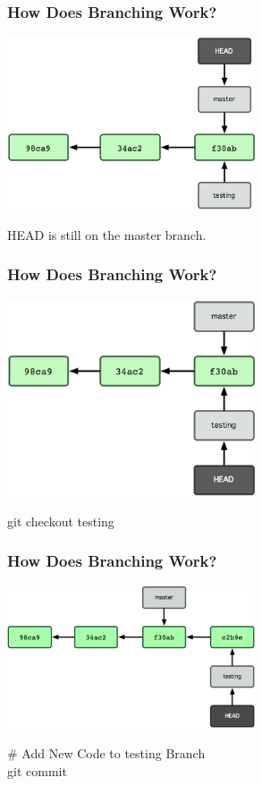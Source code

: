 \begin{frame}
\frametitle{\large How Does Branching Work?}
\begin{center}
\includegraphics[width=0.55\textwidth]{img/branching_images/fig5.png}
\end{center}
\vspace{2mm}
\begin{center}
HEAD is still on the master branch.
\end{center}
\end{frame}

\begin{frame}
\frametitle{\large How Does Branching Work?}
\begin{center}
\includegraphics[width=0.55\textwidth]{img/branching_images/fig6.png}
\end{center}
\vspace{2mm}
\begin{center}
git checkout testing
\end{center}
\end{frame}

\begin{frame}
\frametitle{\large How Does Branching Work?}
\begin{center}
\includegraphics[width=0.55\textwidth]{img/branching_images/fig7.png}
\end{center}
\vspace{2mm}
\begin{center}
\# Add New Code to testing Branch\\
git commit
\end{center}
\end{frame}

